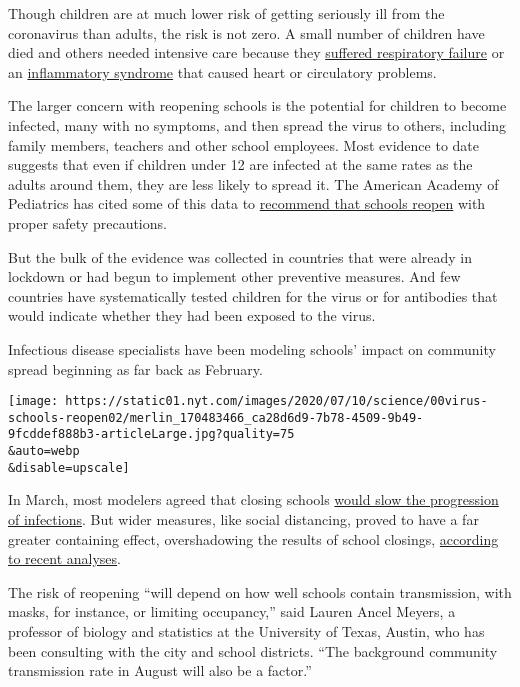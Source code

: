 Though children are at much lower risk of getting seriously ill from the
coronavirus than adults, the risk is not zero. A small number of
children have died and others needed intensive care because they
\href{https://www.nytimes.com/2020/04/06/health/coronavirus-children-us.html}{suffered
respiratory failure} or an
\href{https://www.nytimes.com/2020/05/17/health/coronavirus-multisystem-fnflammatory-syndrome-children-teenagers.html}{inflammatory
syndrome} that caused heart or circulatory problems.

The larger concern with reopening schools is the potential for children
to become infected, many with no symptoms, and then spread the virus to
others, including family members, teachers and other school employees.
Most evidence to date suggests that even if children under 12 are
infected at the same rates as the adults around them, they are less
likely to spread it. The American Academy of Pediatrics has cited some
of this data to
\href{https://services.aap.org/en/pages/2019-novel-coronavirus-covid-19-infections/clinical-guidance/covid-19-planning-considerations-return-to-in-person-education-in-schools/}{recommend
that schools reopen} with proper safety precautions.

But the bulk of the evidence was collected in countries that were
already in lockdown or had begun to implement other preventive measures.
And few countries have systematically tested children for the virus or
for antibodies that would indicate whether they had been exposed to the
virus.

Infectious disease specialists have been modeling schools' impact on
community spread beginning as far back as February.

\texttt{[image: https://static01.nyt.com/images/2020/07/10/science/00virus-schools-reopen02/merlin\_170483466\_ca28d6d9-7b78-4509-9b49-9fcddef888b3-articleLarge.jpg?quality=75\\\&auto=webp\\\&disable=upscale]}

In March, most modelers agreed that closing schools
\href{https://www.nytimes.com/2020/05/05/health/coronavirus-children-transmission-school.html}{would
slow the progression of infections}. But wider measures, like social
distancing, proved to have a far greater containing effect,
overshadowing the results of school closings,
\href{https://www.medrxiv.org/content/10.1101/2020.04.16.20068403v1}{according
to recent analyses}.

The risk of reopening ``will depend on how well schools contain
transmission, with masks, for instance, or limiting occupancy,'' said
Lauren Ancel Meyers, a professor of biology and statistics at the
University of Texas, Austin, who has been consulting with the city and
school districts. ``The background community transmission rate in August
will also be a factor.''

